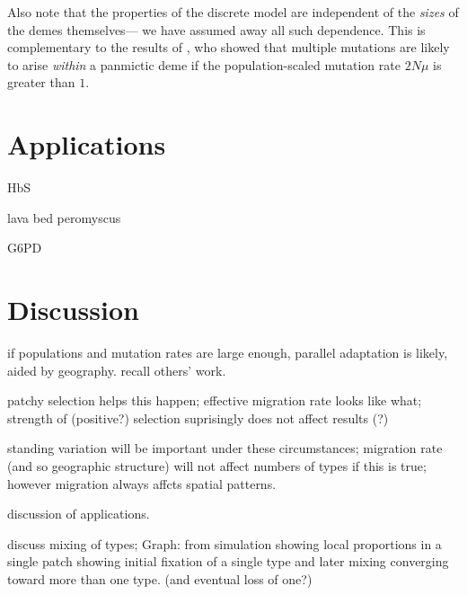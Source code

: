 \documentclass{article}
\begin{document}
{%

Also note that the properties of the discrete model are independent of the {\em sizes} of the demes themselves--- we have assumed away all such dependence.
This is complementary to the results of \cite{softsweepsII}, who showed that multiple mutations are likely to arise {\em within} a panmictic deme
if the population-scaled mutation rate $2 N \mu$ is greater than $1$.

\section{Applications} 

HbS

lava bed peromyscus

G6PD

\section{Discussion} 

if populations and mutation rates are large enough, parallel adaptation is likely, aided by geography. 
recall others' work. 

patchy selection helps this happen; 
effective migration rate looks like what; 
strength of (positive?) selection suprisingly does not affect results (?) 

standing variation will be important under these circumstances; 
migration rate (and so geographic structure) will not affect numbers of types if this is true; 
however migration always affcts spatial patterns. 

discussion of applications. 

discuss mixing of types; 
Graph: from simulation showing local proportions in a single patch showing initial fixation of a single type and later mixing converging toward more than one type.  (and eventual loss of one?)



}
\end{document}
